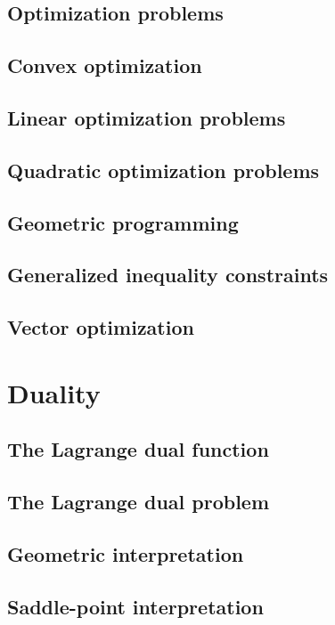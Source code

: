 \documentclass[11pt,oneside,a4paper]{book}
\theoremstyle{definition}
\DeclareRobustCommand{\[}{\begin{equation}}
\DeclareRobustCommand{\]}{\end{equation}}
\begin{document}
\section{Optimization problems}

\section{Convex optimization}

\section{Linear optimization problems}

\section{Quadratic optimization problems}

\section{Geometric programming}

\section{Generalized inequality constraints}

\section{Vector optimization}

\chapter{Duality}

\section{The Lagrange dual function}

\section{The Lagrange dual problem}

\section{Geometric interpretation}

\section{Saddle-point interpretation}
\end{document}
